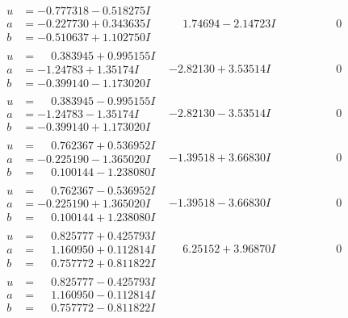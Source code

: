 \documentclass[1p]{elsarticle_modified}
\theoremstyle{definition}
\begin{document}
$$\begin{array}{c|c|c}
\begin{aligned}
u &= -0.777318 - 0.518275 I \\
a &= -0.227730 + 0.343635 I \\
b &= -0.510637 + 1.102750 I\end{aligned}
 & \phantom{-}1.74694 - 2.14723 I & \phantom{-0.000000 } 0 \\ \hline\begin{aligned}
u &= \phantom{-}0.383945 + 0.995155 I \\
a &= -1.24783 + 1.35174 I \\
b &= -0.399140 - 1.173020 I\end{aligned}
 & -2.82130 + 3.53514 I & \phantom{-0.000000 } 0 \\ \hline\begin{aligned}
u &= \phantom{-}0.383945 - 0.995155 I \\
a &= -1.24783 - 1.35174 I \\
b &= -0.399140 + 1.173020 I\end{aligned}
 & -2.82130 - 3.53514 I & \phantom{-0.000000 } 0 \\ \hline\begin{aligned}
u &= \phantom{-}0.762367 + 0.536952 I \\
a &= -0.225190 - 1.365020 I \\
b &= \phantom{-}0.100144 - 1.238080 I\end{aligned}
 & -1.39518 + 3.66830 I & \phantom{-0.000000 } 0 \\ \hline\begin{aligned}
u &= \phantom{-}0.762367 - 0.536952 I \\
a &= -0.225190 + 1.365020 I \\
b &= \phantom{-}0.100144 + 1.238080 I\end{aligned}
 & -1.39518 - 3.66830 I & \phantom{-0.000000 } 0 \\ \hline\begin{aligned}
u &= \phantom{-}0.825777 + 0.425793 I \\
a &= \phantom{-}1.160950 + 0.112814 I \\
b &= \phantom{-}0.757772 + 0.811822 I\end{aligned}
 & \phantom{-}6.25152 + 3.96870 I & \phantom{-0.000000 } 0 \\ \hline\begin{aligned}
u &= \phantom{-}0.825777 - 0.425793 I \\
a &= \phantom{-}1.160950 - 0.112814 I \\
b &= \phantom{-}0.757772 - 0.811822 I\end{aligned}

\end{array}$$
\end{document}
